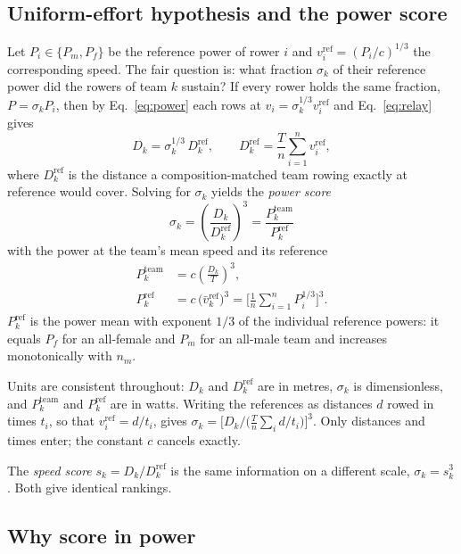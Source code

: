 \documentclass[twocolumn, 10pt]{article}
\newcommand{\Pref}{P^{\mathrm{ref}}}
\newcommand{\Dref}{D^{\mathrm{ref}}}
\begin{document}
\subsection{Uniform-effort hypothesis and the power score}

Let $P_i\in\{P_m,P_f\}$ be the reference power of rower $i$ and
$v_i^{\mathrm{ref}}=(P_i/c)^{1/3}$ the corresponding speed.
The fair question is: what fraction $\sigma_k$ of their reference power did
the rowers of team $k$ sustain?
If every rower holds the same fraction, $P=\sigma_k P_i$, then by
Eq.~\eqref{eq:power} each rows at $v_i=\sigma_k^{1/3}v_i^{\mathrm{ref}}$ and
Eq.~\eqref{eq:relay} gives
\begin{equation}
  D_k = \sigma_k^{1/3}\,\Dref_k, \qquad
  \Dref_k = \frac{T}{n}\sum_{i=1}^{n} v_i^{\mathrm{ref}},
  \label{eq:dref}
\end{equation}
where $\Dref_k$ is the distance a composition-matched team rowing exactly
at reference would cover.
Solving for $\sigma_k$ yields the \emph{power score}
\begin{equation}
  \boxed{\;\sigma_k = \left(\frac{D_k}{\Dref_k}\right)^{\!3}
        = \frac{P_k^{\mathrm{team}}}{\Pref_k}\;}
  \label{eq:score}
\end{equation}
with the power at the team's mean speed and its reference
\begin{align}
  P_k^{\mathrm{team}} &= c\left(\frac{D_k}{T}\right)^{\!3}, \label{eq:team_power}\\
  \Pref_k &= c\,\bigl(\bar v_k^{\mathrm{ref}}\bigr)^{3}
            = \Biggl[\frac{1}{n}\sum_{i=1}^{n}P_i^{1/3}\Biggr]^{3}.
  \label{eq:pref}
\end{align}
$\Pref_k$ is the power mean with exponent $1/3$ of the individual reference
powers: it equals $P_f$ for an all-female and $P_m$ for an all-male team
and increases monotonically with $n_m$.

Units are consistent throughout: $D_k$ and $\Dref_k$ are in metres, $\sigma_k$
is dimensionless, and $P^{\mathrm{team}}_k$ and $\Pref_k$ are in watts.
Writing the references as distances $d$ rowed in times $t_i$, so that
$v_i^{\mathrm{ref}}=d/t_i$, gives
$\sigma_k=\bigl[D_k\big/\bigl(\tfrac{T}{n}\sum_i d/t_i\bigr)\bigr]^3$.
Only distances and times enter; the constant $c$ cancels exactly.

The \emph{speed score} $s_k=D_k/\Dref_k$ is the same information on a
different scale, $\sigma_k=s_k^3$.
Both give identical rankings.

\subsection{Why score in power}
\end{document}
